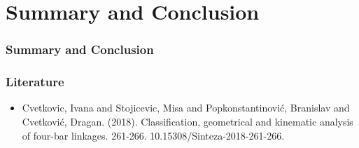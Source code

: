 \documentclass[ucs,10pt]{beamer}
\begin{document}
\section{Summary and Conclusion}

\begin{frame}
\frametitle{Summary and Conclusion}
\end{frame}

\begin{frame}
\frametitle{Literature}
	\begin{itemize}
		\item Cvetkovic, Ivana and Stojicevic, Misa and Popkonstantinović, Branislav and Cvetković, Dragan. (2018). Classification, geometrical and kinematic analysis of four-bar linkages. 261-266. 10.15308/Sinteza-2018-261-266.
	\end{itemize}
\end{frame}
\end{document}
